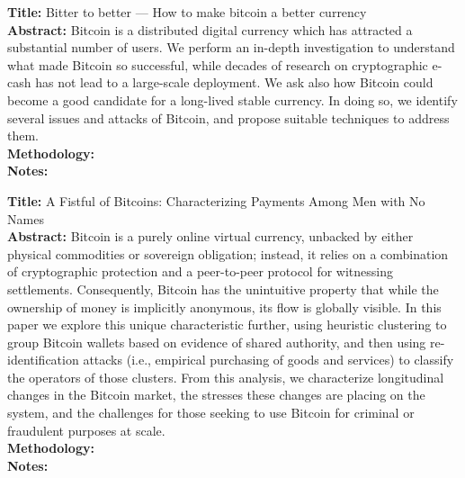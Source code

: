 \documentclass[a4paper, 12pt]{scrartcl}
\begin{document}
\textbf{Title:} Bitter to better — How to make bitcoin a better currency \parencite{barber2012bitter} \\
\textbf{Abstract:} Bitcoin is a distributed digital currency which has attracted a substantial number of users. We perform an in-depth investigation to understand what made Bitcoin so successful, while decades of research on cryptographic e-cash has not lead to a large-scale deployment. We ask also how Bitcoin could become a good candidate for a long-lived stable currency. In doing so, we identify several issues and attacks of Bitcoin, and propose suitable techniques to address them.\\
\textbf{Methodology:} \\
\textbf{Notes:}

\textbf{Title:} A Fistful of Bitcoins: Characterizing Payments Among Men with No Names \parencite{Meiklejohn:2013:FBC:2504730.2504747} \\
\textbf{Abstract:} Bitcoin is a purely online virtual currency, unbacked by either physical commodities or sovereign obligation; instead, it relies on a combination of cryptographic protection and a peer-to-peer protocol for witnessing settlements. Consequently, Bitcoin has the unintuitive property that while the ownership of money is implicitly anonymous, its flow is globally visible. In this paper we explore this unique characteristic further, using heuristic clustering to group Bitcoin wallets based on evidence of shared authority, and then using re-identification attacks (i.e., empirical purchasing of goods and services) to classify the operators of those clusters. From this analysis, we characterize longitudinal changes in the Bitcoin market, the stresses these changes are placing on the system, and the challenges for those seeking to use Bitcoin for criminal or fraudulent purposes at scale.\\
\textbf{Methodology:} \\
\textbf{Notes:}
\end{document}
